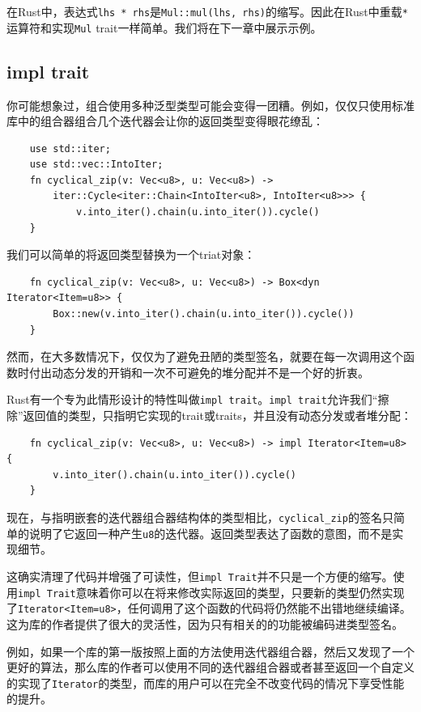 在Rust中，表达式\texttt{lhs * rhs}是\texttt{Mul::mul(lhs, rhs)}的缩写。因此在Rust中重载\texttt{*}运算符和实现\texttt{Mul} trait一样简单。我们将在下一章中展示示例。

\subsection{impl trait}
你可能想象过，组合使用多种泛型类型可能会变得一团糟。例如，仅仅只使用标准库中的组合器组合几个迭代器会让你的返回类型变得眼花缭乱：
\begin{verbatim}
    use std::iter;
    use std::vec::IntoIter;
    fn cyclical_zip(v: Vec<u8>, u: Vec<u8>) ->
        iter::Cycle<iter::Chain<IntoIter<u8>, IntoIter<u8>>> {
            v.into_iter().chain(u.into_iter()).cycle()
    }
\end{verbatim}

我们可以简单的将返回类型替换为一个triat对象：
\begin{verbatim}
    fn cyclical_zip(v: Vec<u8>, u: Vec<u8>) -> Box<dyn Iterator<Item=u8>> {
        Box::new(v.into_iter().chain(u.into_iter()).cycle())
    }
\end{verbatim}

然而，在大多数情况下，仅仅为了避免丑陋的类型签名，就要在每一次调用这个函数时付出动态分发的开销和一次不可避免的堆分配并不是一个好的折衷。

Rust有一个专为此情形设计的特性叫做\texttt{impl trait}。\texttt{impl trait}允许我们“擦除”返回值的类型，只指明它实现的trait或traits，并且没有动态分发或者堆分配：
\begin{verbatim}
    fn cyclical_zip(v: Vec<u8>, u: Vec<u8>) -> impl Iterator<Item=u8> {
        v.into_iter().chain(u.into_iter()).cycle()
    }
\end{verbatim}

现在，与指明嵌套的迭代器组合器结构体的类型相比，\texttt{cyclical\_zip}的签名只简单的说明了它返回一种产生\texttt{u8}的迭代器。返回类型表达了函数的意图，而不是实现细节。

这确实清理了代码并增强了可读性，但\texttt{impl Trait}并不只是一个方便的缩写。使用\texttt{impl Trait}意味着你可以在将来修改实际返回的类型，只要新的类型仍然实现了\texttt{Iterator<Item=u8>}，任何调用了这个函数的代码将仍然能不出错地继续编译。这为库的作者提供了很大的灵活性，因为只有相关的的功能被编码进类型签名。

例如，如果一个库的第一版按照上面的方法使用迭代器组合器，然后又发现了一个更好的算法，那么库的作者可以使用不同的迭代器组合器或者甚至返回一个自定义的实现了\texttt{Iterator}的类型，而库的用户可以在完全不改变代码的情况下享受性能的提升。

